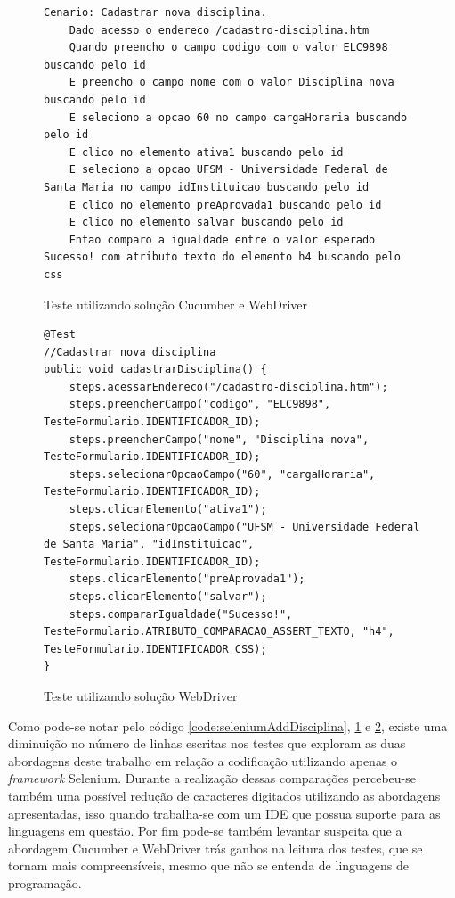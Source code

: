 \documentclass[tg]{mdtufsm}
\begin{document}
\begin{figure}[!htt]
	\begin{lstlisting}
Cenario: Cadastrar nova disciplina.
    Dado acesso o endereco /cadastro-disciplina.htm
    Quando preencho o campo codigo com o valor ELC9898 buscando pelo id
    E preencho o campo nome com o valor Disciplina nova buscando pelo id
    E seleciono a opcao 60 no campo cargaHoraria buscando pelo id
    E clico no elemento ativa1 buscando pelo id
    E seleciono a opcao UFSM - Universidade Federal de Santa Maria no campo idInstituicao buscando pelo id
    E clico no elemento preAprovada1 buscando pelo id
    E clico no elemento salvar buscando pelo id
    Entao comparo a igualdade entre o valor esperado Sucesso! com atributo texto do elemento h4 buscando pelo css
	\end{lstlisting}
	\caption{Teste utilizando solução Cucumber e WebDriver}
	\label{code:solucao2AddDisciplina}
\end{figure}

\begin{figure}[!htt]
	\begin{lstlisting}
@Test
//Cadastrar nova disciplina
public void cadastrarDisciplina() {
    steps.acessarEndereco("/cadastro-disciplina.htm");
    steps.preencherCampo("codigo", "ELC9898", TesteFormulario.IDENTIFICADOR_ID);
    steps.preencherCampo("nome", "Disciplina nova", TesteFormulario.IDENTIFICADOR_ID);
    steps.selecionarOpcaoCampo("60", "cargaHoraria", TesteFormulario.IDENTIFICADOR_ID);
    steps.clicarElemento("ativa1");
    steps.selecionarOpcaoCampo("UFSM - Universidade Federal de Santa Maria", "idInstituicao", TesteFormulario.IDENTIFICADOR_ID);
    steps.clicarElemento("preAprovada1");
    steps.clicarElemento("salvar");
    steps.compararIgualdade("Sucesso!", TesteFormulario.ATRIBUTO_COMPARACAO_ASSERT_TEXTO, "h4", TesteFormulario.IDENTIFICADOR_CSS);
}
	\end{lstlisting}
	\caption{Teste utilizando solução WebDriver}
	\label{code:solucao3AddDisciplina}
\end{figure}

Como pode-se notar pelo código \ref{code:seleniumAddDisciplina}, \ref{code:solucao2AddDisciplina} e \ref{code:solucao3AddDisciplina}, existe uma diminuição no número de linhas
escritas nos testes que exploram as duas abordagens deste trabalho em relação a codificação utilizando apenas o \emph{framework} Selenium. Durante a realização dessas
comparações percebeu-se também uma possível redução de caracteres digitados utilizando as abordagens apresentadas, isso quando trabalha-se com um IDE que possua suporte
para as linguagens em questão. Por fim pode-se também levantar suspeita que a abordagem Cucumber e WebDriver trás ganhos na leitura dos testes, que se tornam mais
compreensíveis, mesmo que não se entenda de linguagens de programação.
\end{document}
